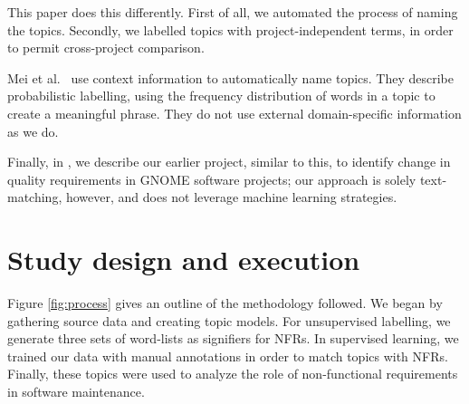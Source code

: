 \documentclass[]{sig-alternate}
\begin{document}
This paper does this differently. First of all, we automated the process of naming the topics. Secondly, we labelled topics with project-independent terms, in order to permit cross-project comparison.

Mei et al.~\cite{Mei2007} use context information to automatically name topics. 
They describe probabilistic labelling, using the frequency distribution of words in a topic to create a meaningful phrase. 
They do not use external domain-specific information as we do.

Finally, in \cite{ernst10refsq}, we describe our earlier project, similar to this, to identify change in quality requirements in GNOME software projects; our approach is solely text-matching, however, and does not leverage machine learning strategies.




\section{Study design and execution}
Figure \ref{fig:process} gives an outline of the methodology followed. 
We began by gathering source data and creating topic models. For unsupervised labelling, we generate three sets of word-lists as signifiers for NFRs.
In supervised learning, we trained our data with manual annotations in order to match topics with NFRs. Finally, these topics were used to analyze the role of non-functional requirements in software maintenance.
\end{document}
